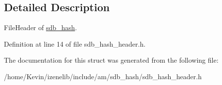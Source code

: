 \subsection{Detailed Description}
FileHeader of \hyperlink{classsdb__hash}{sdb\_\-hash}. 

Definition at line 14 of file sdb\_\-hash\_\-header.h.

The documentation for this struct was generated from the following file:\begin{CompactItemize}
\item 
/home/Kevin/izenelib/include/am/sdb\_\-hash/sdb\_\-hash\_\-header.h\end{CompactItemize}
